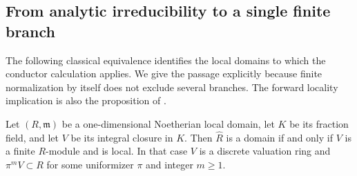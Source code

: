 \subsection{From analytic irreducibility to a single finite branch}
The following classical equivalence identifies the local domains to which
the conductor calculation applies.  We give the passage explicitly because
finite normalization by itself does not exclude several branches.
The forward locality implication is also the proposition of
\cite[\S2, p.~49, proof pp.~49--50]{CahenGrazziniHaouat1982}.

\begin{proposition}
\label{prop:analytic-one-branch}
Let $(R,\mathfrak m)$ be a one-dimensional Noetherian local domain,
let $K$ be its fraction field, and let $V$ be its integral closure in $K$.
Then $\widehat R$ is a domain if and only if $V$ is a finite $R$-module
and is local.  In that case $V$ is a discrete valuation ring and
$\pi^mV\subset R$ for some uniformizer $\pi$ and integer $m\geq1$.
\end{proposition}
